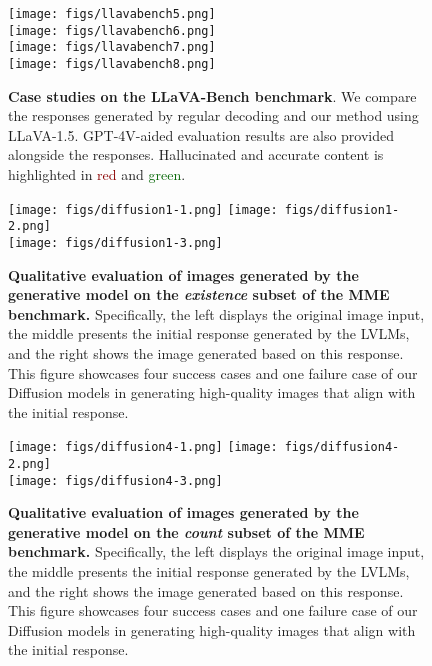 \begin{figure}[t]

\texttt{[image: figs/llavabench5.png]}
\\[10pt]
\texttt{[image: figs/llavabench6.png]}
\\[10pt]
\texttt{[image: figs/llavabench7.png]}
\\[10pt]
\texttt{[image: figs/llavabench8.png]}

\caption{\textbf{Case studies on the LLaVA-Bench benchmark}. We compare the responses generated by regular decoding and our method using LLaVA-1.5. GPT-4V-aided evaluation results are also provided alongside the responses. Hallucinated and accurate content is highlighted in \textcolor{darkred}{red} and \textcolor{darkgreen}{green}.} 

\label{fig:llavabench3}
\end{figure}


\begin{figure}[t]
\centering
\texttt{[image: figs/diffusion1-1.png]}
\texttt{[image: figs/diffusion1-2.png]}
\\[5pt]
\texttt{[image: figs/diffusion1-3.png]}
\vspace{-10pt}
\caption{\textbf{Qualitative evaluation of images generated by the generative model on the \textit{existence} subset of the MME benchmark.} Specifically, the left displays the original image input, the middle presents the initial response generated by the LVLMs, and the right shows the image generated based on this response. This figure showcases four success cases and one failure case of our Diffusion models in generating high-quality images that align with the initial response.}
\label{fig:diffusion1}
\end{figure}

\begin{figure}[t]
\centering
\texttt{[image: figs/diffusion4-1.png]}
\texttt{[image: figs/diffusion4-2.png]}
\\[5pt]
\texttt{[image: figs/diffusion4-3.png]}
\vspace{-10pt}
\caption{\textbf{Qualitative evaluation of images generated by the generative model on the \textit{count} subset of the MME benchmark.} Specifically, the left displays the original image input, the middle presents the initial response generated by the LVLMs, and the right  shows the image generated based on this response. This figure showcases four success cases and one failure case of our Diffusion models in generating high-quality images that align with the initial response.}
\label{fig:diffusion2}
\end{figure}

